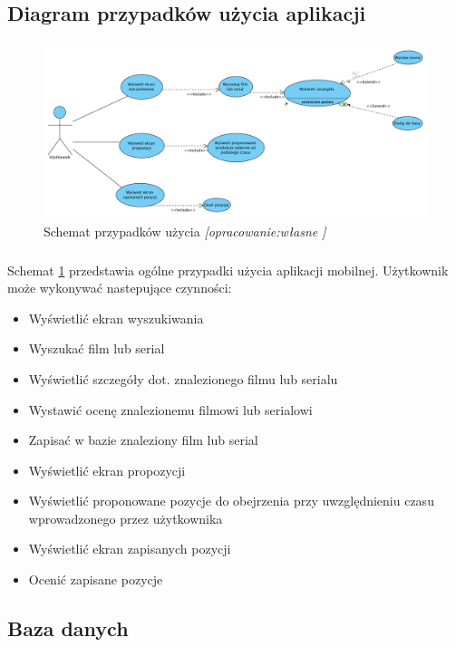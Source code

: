 \documentclass[12pt,oneside,a4paper]{report}
\begin{document}
\subsection{Diagram przypadków użycia aplikacji}
\begin{figure}[ht!]
	\centering
	\includegraphics[width=17cm]{useCase'y}
	\caption{Schemat przypadków użycia 
		\textit{[opracowanie:własne ]}}
	\label{useCase'y}
\end{figure}
\subparagraph{}Schemat \ref{useCase'y} przedstawia ogólne przypadki użycia aplikacji mobilnej. Użytkownik może wykonywać nastepujące czynności:
\begin{itemize}
	\item Wyświetlić ekran wyszukiwania
	\item Wyszukać film lub serial
	\item Wyświetlić szczegóły dot. znalezionego filmu lub serialu
	\item Wystawić ocenę znalezionemu filmowi lub serialowi
	\item Zapisać w bazie znaleziony film lub serial
	\item Wyświetlić ekran propozycji
	\item Wyświetlić proponowane pozycje do obejrzenia przy uwzględnieniu czasu wprowadzonego przez użytkownika
	\item Wyświetlić ekran zapisanych pozycji
	\item Ocenić zapisane pozycje
\end{itemize}
\subsection{Baza danych}
\end{document}
